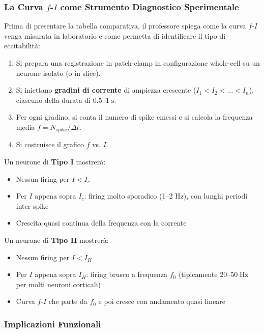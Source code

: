 \subsubsection{La Curva $f$-$I$ come Strumento Diagnostico Sperimentale}

Prima di presentare la tabella comparativa, il professore spiega come la curva $f$-$I$ venga misurata in laboratorio e come permetta di identificare il tipo di eccitabilità:

\begin{enumerate}
    \item Si prepara una registrazione in patch-clamp in configurazione whole-cell su un neurone isolato (o in slice).
    \item Si iniettano \textbf{gradini di corrente} di ampiezza crescente ($I_1 < I_2 < \ldots < I_n$), ciascuno della durata di $0.5$–$1 \; \text{s}$.
    \item Per ogni gradino, si conta il numero di spike emessi e si calcola la frequenza media $f = N_{\text{spike}}/\Delta t$.
    \item Si costruisce il grafico $f$ vs. $I$.
\end{enumerate}

Un neurone di \textbf{Tipo I} mostrerà:
\begin{itemize}
    \item Nessun firing per $I < I_c$
    \item Per $I$ appena sopra $I_c$: firing molto sporadico (1–2 Hz), con lunghi periodi inter-spike
    \item Crescita quasi continua della frequenza con la corrente
\end{itemize}

Un neurone di \textbf{Tipo II} mostrerà:
\begin{itemize}
    \item Nessun firing per $I < I_H$
    \item Per $I$ appena sopra $I_H$: firing brusco a frequenza $f_0$ (tipicamente $20$–$50 \; \text{Hz}$ per molti neuroni corticali)
    \item Curva $f$-$I$ che parte da $f_0$ e poi cresce con andamento quasi lineare
\end{itemize}

\subsubsection{Implicazioni Funzionali}

